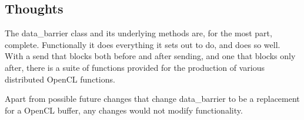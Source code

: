 \documentclass[../thesis.tex]{subfiles}
\begin{document}
\subsection{Thoughts} %
\label{sub:thoughts}
  The data\_barrier class and its underlying methods are, for the most part, complete. Functionally it does everything it sets out to do, and does so well. With a send that blocks both before and after sending, and one that blocks only after, there is a suite of functions provided for the production of various distributed OpenCL functions.

  Apart from possible future changes that change data\_barrier to be a replacement for a OpenCL buffer, any changes would not modify functionality.

\label{sub:data_barrier_class}
\end{document}
